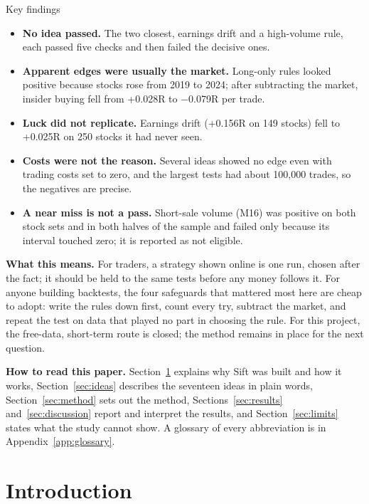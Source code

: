 \documentclass[11pt,a4paper]{article}
\begin{document}
\begin{keybox}{Key findings}
\begin{itemize}[leftmargin=1.2em]
\item \textbf{No idea passed.} The two closest, earnings drift and a high-volume rule, each passed five checks and then
      failed the decisive ones.
\item \textbf{Apparent edges were usually the market.} Long-only rules looked positive because stocks rose from 2019 to 2024;
      after subtracting the market, insider buying fell from +0.028R to −0.079R per trade.
\item \textbf{Luck did not replicate.} Earnings drift (+0.156R on 149 stocks) fell to +0.025R on 250 stocks it had never
      seen.
\item \textbf{Costs were not the reason.} Several ideas showed no edge even with trading costs set to zero, and the largest
      tests had about 100,000 trades, so the negatives are precise.
\item \textbf{A near miss is not a pass.} Short-sale volume (M16) was positive on both stock sets and in both halves of the
      sample and failed only because its interval touched zero; it is reported as not eligible.
\end{itemize}
\end{keybox}

\textbf{What this means.} For traders, a strategy shown online is one run, chosen after the fact; it should be held to the
same tests before any money follows it. For anyone building backtests, the four safeguards that mattered most here are
cheap to adopt: write the rules down first, count every try, subtract the market, and repeat the test on data that played
no part in choosing the rule. For this project, the free-data, short-term route is closed; the method remains in place for
the next question.

\textbf{How to read this paper.} Section~\ref{sec:intro} explains why Sift was built and how it works,
Section~\ref{sec:ideas} describes the seventeen ideas in plain words, Section~\ref{sec:method} sets out the method,
Sections~\ref{sec:results} and~\ref{sec:discussion} report and interpret the results, and Section~\ref{sec:limits} states
what the study cannot show. A glossary of every abbreviation is in Appendix~\ref{app:glossary}.

\clearpage
\section{Introduction}\label{sec:intro}
\end{document}
